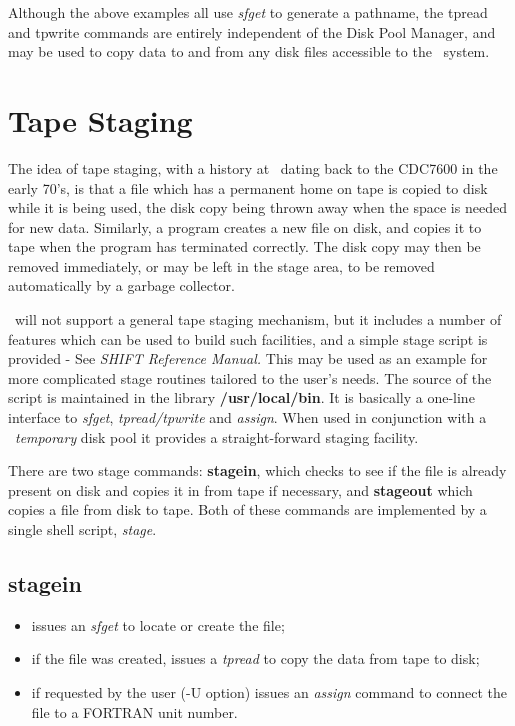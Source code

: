 Although the above examples all use {\it sfget} to generate a pathname, the
 tpread and tpwrite
commands are entirely independent of the Disk Pool Manager, and may be used to
 copy data to and
from any disk files accessible to the \shift\ system.
 
 
\section{Tape Staging}
 
The idea of tape staging, with a history at \CERN\ dating back to the CDC7600
in the early 70's, is that a file which has a permanent home on tape
is copied to disk while it is being used, the disk copy being thrown away when
 the
space is needed for new data. Similarly, a program creates a new file on disk,
 and
copies it to tape when the program has terminated correctly. The disk copy may
 then
be removed immediately, or may be left in the stage area, to be removed
 automatically
by a garbage collector.
 
\shift\ will not support a general tape staging mechanism, but it includes a
 number of features
which can be used to build such facilities, and a simple stage script is
 provided -
See {\em SHIFT Reference Manual.}
This may be used as an example for more complicated
stage routines tailored to the user's needs.  The source of the script is
 maintained in the library
{\bf /usr/local/bin}. It is basically a one-line interface to {\it sfget}, {\it
 tpread/tpwrite}
and {\it assign}. When used in conjunction with a \shift\ {\it temporary} disk
 pool it provides
a straight-forward staging facility.
 
There are two stage commands: {\bf stagein}, which checks to see if the file is
 already present on
disk and copies it in from tape if necessary, and {\bf stageout} which copies a
 file from disk to
tape. Both of these commands are implemented by a single shell script, {\it
 stage}.
 
\subsection{stagein}
\begin{itemize}
\item issues an {\it sfget} to locate or create the file;
\item if the file was created, issues a {\it tpread} to copy the
data from tape to disk;
\item if requested by the user (-U option) issues an {\it assign} command
to connect the file to a FORTRAN unit number.
\end{itemize}
 
